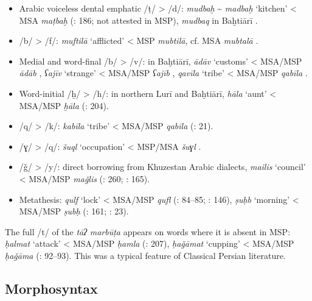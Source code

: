 \documentclass[output=paper]{langsci/langscibook}
\begin{document}
\begin{itemize}
\item[]
Arabic voiceless dental emphatic /ṭ/ > /d/: \textit{mudbaḫ} \~{} \textit{madbaḫ} ‘kitchen’ < MSA \textit{maṭbaḫ} (\citealt{Ṣarrāfī1996}: 186; not attested in MSP), \textit{mudbaq} in Baḫtiārī \citep[251]{Sarlak2002}.

\item[]
/b/ > /f/: \emph{muftilā} ‘afflicted’ < MSP \textit{mubtilā}, cf. MSA  \textit{mubtalā} \citep{Borjian2017}.

\item[]
Medial and word-final /b/ > /v/: in Baḫtiārī, \textit{ādāv} ‘customs’ < MSA/MSP \textit{ādāb} \citep[15]{Sarlak2002}, \textit{ʕajīv} ‘strange’ < MSA/MSP \textit{ʕajīb} \citep[25]{Sarlak2002}, \textit{qavīla} ‘tribe’ < MSA/MSP \textit{qabīla} \citep[199]{Sarlak2002}.

\item[]
Word-initial /ḫ/ > /h/: in northern Lurī and Baḫtiārī, \textit{hāla} ‘aunt’ < MSA/MSP \textit{ḫāla} (\citealt{Īzadpanāh2001}: 204).

\item[]
/q/ > /k/: \textit{kabīla} ‘tribe’ < MSA/MSP \textit{qabīla} (\citealt{NaǧībiFīni2002}: 21).

\item[]
/ɣ/ > /q/: \textit{šuql} ‘occupation’ < MSP/MSA \textit{šuɣl} \citep{Stilo2001}.

\item[]
/ǧ/ > /y/: direct borrowing from Khuzestan Arabic dialects, \textit{mailis} ‘council’ < MSA/MSP \textit{maǧlis} (\citealt{Sarlak2002}: 260; \citealt{Fāẓilī2004}: 165).

\item[]
Metathesis: \textit{qulf} ‘lock’ < MSA/MSP \textit{qufl} (\citealt{Salāmī2004}: 84–85; \citealt{ImāmAhwāzī2000}: 146), \textit{ṣuḥb} ‘morning’ < MSA/MSP \textit{ṣubḥ} (\citealt{Dānišgar1995}: 161; \citealt{NaǧībiFīni2002}: 23).
\end{itemize}

The full /t/ of the \textit{tāʔ} \textit{marbūṭa} appears on words where it is absent in MSP: \textit{ḥalmat} ‘attack’ < MSA/MSP \textit{ḥamla} (\citealt{Īzadpanāh2001}: 207), \textit{ḥaǧāmat} ‘cupping’ < MSA/MSP \textit{ḥaǧāma} (\citealt{Salāmī2004}: 92–93). This was a typical feature of Classical Persian literature.

\subsection{Morphosyntax}
\end{document}
